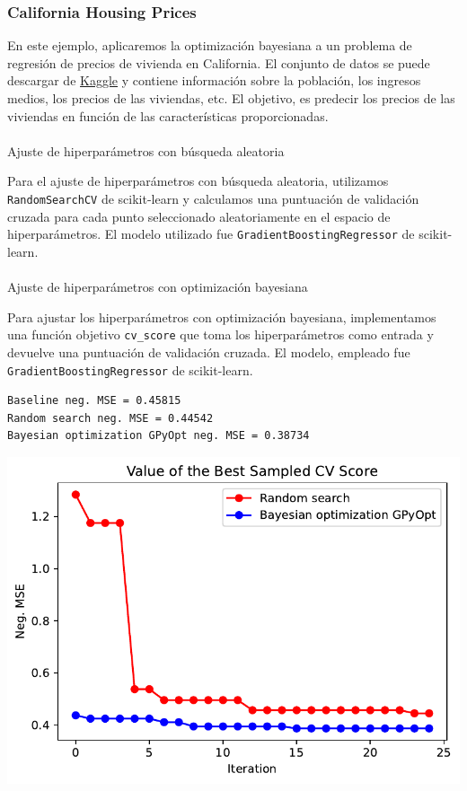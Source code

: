 \documentclass[
  12pt,
  letterpaper,
  DIV=11,
  numbers=noendperiod]{scrartcl}
\makeatletter
\let\oldparagraph\paragraph
\renewcommand{\paragraph}{
    \@ifstar
      \xxxParagraphStar
      \xxxParagraphNoStar
  }
\newcommand{\xxxParagraphStar}[1]{\oldparagraph*{#1}\mbox{}}
\newcommand{\xxxParagraphNoStar}[1]{\oldparagraph{#1}\mbox{}}
\makeatother
\begin{document}
\subsubsection{California Housing
Prices}\label{california-housing-prices}

En este ejemplo, aplicaremos la optimización bayesiana a un problema de
regresión de precios de vivienda en California. El conjunto de datos se
puede descargar de
\href{https://www.kaggle.com/camnugent/california-housing-prices}{Kaggle}
y contiene información sobre la población, los ingresos medios, los
precios de las viviendas, etc. El objetivo, es predecir los precios de
las viviendas en función de las características proporcionadas.

\paragraph{Ajuste de hiperparámetros con búsqueda
aleatoria}\label{ajuste-de-hiperparuxe1metros-con-buxfasqueda-aleatoria-1}

Para el ajuste de hiperparámetros con búsqueda aleatoria, utilizamos
\texttt{RandomSearchCV} de scikit-learn y calculamos una puntuación de
validación cruzada para cada punto seleccionado aleatoriamente en el
espacio de hiperparámetros. El modelo utilizado fue
\texttt{GradientBoostingRegressor} de scikit-learn.

\paragraph{Ajuste de hiperparámetros con optimización
bayesiana}\label{ajuste-de-hiperparuxe1metros-con-optimizaciuxf3n-bayesiana-1}

Para ajustar los hiperparámetros con optimización bayesiana,
implementamos una función objetivo \texttt{cv\_score} que toma los
hiperparámetros como entrada y devuelve una puntuación de validación
cruzada. El modelo, empleado fue \texttt{GradientBoostingRegressor} de
scikit-learn.

\begin{verbatim}
Baseline neg. MSE = 0.45815
Random search neg. MSE = 0.44542
Bayesian optimization GPyOpt neg. MSE = 0.38734
\end{verbatim}

\includegraphics{ProyFinal_OptBayesiana_2024_files/figure-pdf/cell-23-output-1.pdf}
\end{document}
